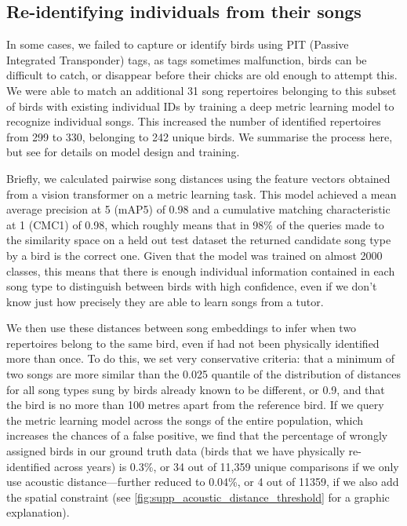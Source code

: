 \subsection{Re-identifying individuals from their songs}

In some cases, we failed to capture or identify birds using PIT (Passive Integrated Transponder) tags, as tags sometimes malfunction, birds can be difficult to catch, or disappear before their chicks are old enough to attempt this.  We were able to match an additional 31 song repertoires belonging to this subset of birds with existing individual IDs by training a deep metric learning model to recognize individual songs. This increased the number of identified repertoires from 299 to 330, belonging to 242 unique birds. We summarise the process here, but see \autocite{merinorecalde2023a} for details on model design and training.

Briefly, we calculated pairwise song distances using the feature vectors obtained from a vision transformer on a metric learning task. This model achieved a mean average precision at 5 (mAP\@5) of 0.98 and a cumulative matching characteristic at 1 (CMC\@1) of 0.98, which roughly means that in 98\% of the queries made to the similarity space on a held out test dataset the returned candidate song type by a bird is the correct one. Given that the model was trained on almost 2000 classes, this means that there is enough individual information contained in each song type to distinguish between birds with high confidence, even if we don’t know just how precisely they are able to learn songs from a tutor. 

We then use these distances between song embeddings to infer when two repertoires belong to the same bird, even if had not been physically identified more than once. To do this, we set very conservative criteria: that a minimum of two songs are more similar than the 0.025 quantile of the distribution of distances for all song types sung by birds already known to be different, or 0.9, and that the bird is no more than 100 metres apart from the reference bird. If we query the metric learning model across the songs of the entire population, which increases the chances of a false positive, we find that the percentage of wrongly assigned birds in our ground truth data (birds that we have physically re-identified across years) is 0.3\%, or 34 out of 11,359 unique comparisons if we only use acoustic distance---further reduced to 0.04\%, or 4 out of 11359, if we also add the spatial constraint (see \autoref{fig:supp_acoustic_distance_threshold} for a graphic explanation).


